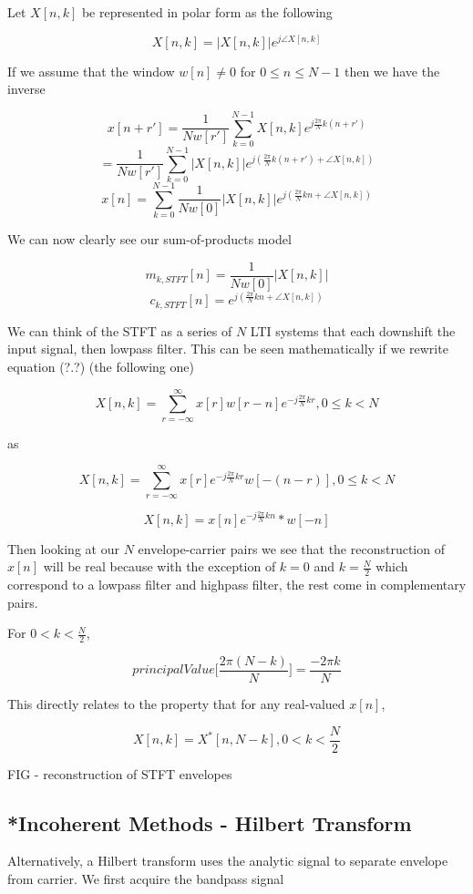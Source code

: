 \documentclass [11pt, proquest] {uwthesis}[2015/03/03]
\begin{document}
Let $X[n,k]$ be represented in polar form as the following

$$X[n,k] = \vert X[n,k]\vert e^{j\angle X[n,k]}$$

If we assume that the window $w[n] \neq 0$ for $0 \leq n \leq N-1$ then we have the inverse

$$x[n + r'] = \frac{1}{Nw[r']}  \sum\limits_{k=0}^{N-1} X[n,k] e^{j\frac{2\pi}{N}k(n+r')}$$
$$= \frac{1}{Nw[r']}  \sum\limits_{k=0}^{N-1} \vert X[n,k]\vert e^{j(\frac{2\pi}{N}k(n+r') + \angle X[n,k])}$$
$$x[n] =\sum\limits_{k=0}^{N-1}  \frac{1}{Nw[0]}  \vert X[n,k]\vert e^{j(\frac{2\pi}{N}kn + \angle X[n,k])}$$

We can now clearly see our sum-of-products model

$$m_{k,STFT}[n] =  \frac{1}{Nw[0]}  \vert X[n,k]\vert$$
$$c_{k,STFT}[n] = e^{j(\frac{2\pi}{N}kn + \angle X[n,k])}$$

We can think of the STFT as a series of $N$ LTI systems that each downshift the input signal, then lowpass filter.  This can be seen mathematically if we rewrite equation (?.?) (the following one)

$$X[n,k] = \sum\limits_{r=-\infty}^{\infty} x[r] w[r - n] e^{-j\frac{2\pi}{N}kr}, 0 \leq k < N$$

as

$$X[n,k] = \sum\limits_{r=-\infty}^{\infty} x[r] e^{-j\frac{2\pi}{N}kr} w[-(n - r)], 0 \leq k < N$$

$$X[n,k] = x[n] e^{-j\frac{2\pi}{N}kn} * w[-n]$$

Then looking at our $N$ envelope-carrier pairs we see that the reconstruction of $x[n]$ will be real because with the exception of $k = 0$ and $k = \frac{N}{2}$ which correspond to a lowpass filter and highpass filter, the rest come in complementary pairs.

For $0 < k < \frac{N}{2}$, 

$$ principalValue \Big[ \frac{2\pi (N-k)}{N} \Big] = \frac{-2\pi k}{N}$$

This directly relates to the property that for any real-valued $x[n]$,

$$X[n,k] = X^*[n,N-k], 0 < k < \frac{N}{2}$$

FIG - reconstruction of STFT envelopes

\subsection{*Incoherent Methods - Hilbert Transform}

Alternatively, a Hilbert transform uses the analytic signal to separate envelope from carrier.  We first acquire the bandpass signal
\end{document}
